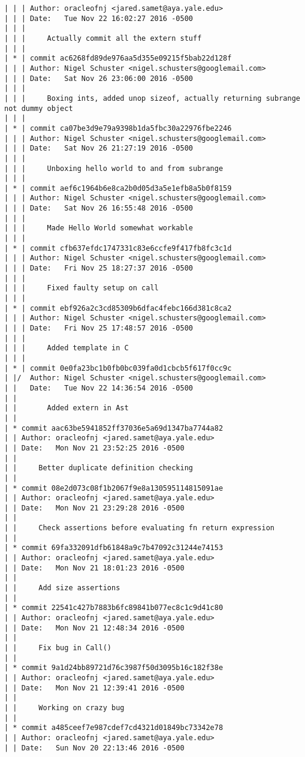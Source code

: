 \begin{lstlisting}
| | | Author: oracleofnj <jared.samet@aya.yale.edu>
| | | Date:   Tue Nov 22 16:02:27 2016 -0500
| | | 
| | |     Actually commit all the extern stuff
| | |    
| * | commit ac6268fd89de976aa5d355e09215f5bab22d128f
| | | Author: Nigel Schuster <nigel.schusters@googlemail.com>
| | | Date:   Sat Nov 26 23:06:00 2016 -0500
| | | 
| | |     Boxing ints, added unop sizeof, actually returning subrange not dummy object
| | |    
| * | commit ca07be3d9e79a9398b1da5fbc30a22976fbe2246
| | | Author: Nigel Schuster <nigel.schusters@googlemail.com>
| | | Date:   Sat Nov 26 21:27:19 2016 -0500
| | | 
| | |     Unboxing hello world to and from subrange
| | |    
| * | commit aef6c1964b6e8ca2b0d05d3a5e1efb8a5b0f8159
| | | Author: Nigel Schuster <nigel.schusters@googlemail.com>
| | | Date:   Sat Nov 26 16:55:48 2016 -0500
| | | 
| | |     Made Hello World somewhat workable
| | |    
| * | commit cfb637efdc1747331c83e6ccfe9f417fb8fc3c1d
| | | Author: Nigel Schuster <nigel.schusters@googlemail.com>
| | | Date:   Fri Nov 25 18:27:37 2016 -0500
| | | 
| | |     Fixed faulty setup on call
| | |    
| * | commit ebf926a2c3cd85309b6dfac4febc166d381c8ca2
| | | Author: Nigel Schuster <nigel.schusters@googlemail.com>
| | | Date:   Fri Nov 25 17:48:57 2016 -0500
| | | 
| | |     Added template in C
| | |    
| * | commit 0e0fa23bc1b0fb0bc039fa0d1cbcb5f617f0cc9c
| |/  Author: Nigel Schuster <nigel.schusters@googlemail.com>
| |   Date:   Tue Nov 22 14:36:54 2016 -0500
| |   
| |       Added extern in Ast
| |   
| * commit aac63be5941852ff37036e5a69d1347ba7744a82
| | Author: oracleofnj <jared.samet@aya.yale.edu>
| | Date:   Mon Nov 21 23:52:25 2016 -0500
| | 
| |     Better duplicate definition checking
| |   
| * commit 08e2d073c08f1b2067f9e8a130595114815091ae
| | Author: oracleofnj <jared.samet@aya.yale.edu>
| | Date:   Mon Nov 21 23:29:28 2016 -0500
| | 
| |     Check assertions before evaluating fn return expression
| |   
| * commit 69fa332091dfb61848a9c7b47092c31244e74153
| | Author: oracleofnj <jared.samet@aya.yale.edu>
| | Date:   Mon Nov 21 18:01:23 2016 -0500
| | 
| |     Add size assertions
| |   
| * commit 22541c427b7883b6fc89841b077ec8c1c9d41c80
| | Author: oracleofnj <jared.samet@aya.yale.edu>
| | Date:   Mon Nov 21 12:48:34 2016 -0500
| | 
| |     Fix bug in Call()
| |   
| * commit 9a1d24bb89721d76c3987f50d3095b16c182f38e
| | Author: oracleofnj <jared.samet@aya.yale.edu>
| | Date:   Mon Nov 21 12:39:41 2016 -0500
| | 
| |     Working on crazy bug
| |   
| * commit a485ceef7e987cdef7cd4321d01849bc73342e78
| | Author: oracleofnj <jared.samet@aya.yale.edu>
| | Date:   Sun Nov 20 22:13:46 2016 -0500

\end{lstlisting}
